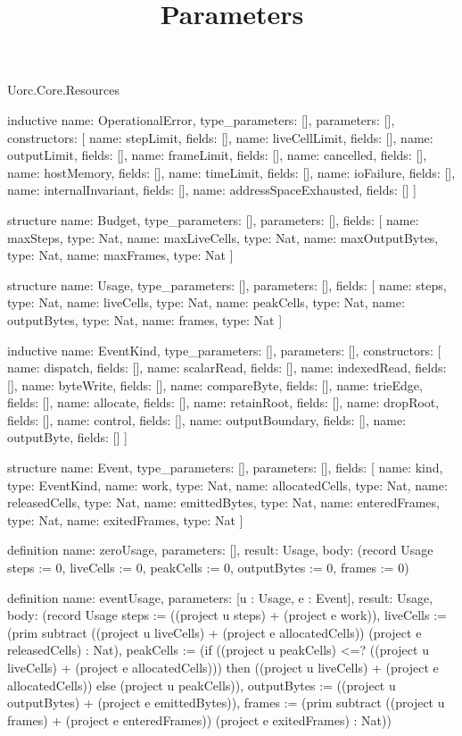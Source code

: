 \begin{lexlean}{Uorc.Core.Resources}
\title{Parameters}
\begin{semanticmodule}
inductive{
  name: OperationalError,
  type_parameters: [],
  parameters: [],
  constructors: [
    {name: stepLimit, fields: []},
    {name: liveCellLimit, fields: []},
    {name: outputLimit, fields: []},
    {name: frameLimit, fields: []},
    {name: cancelled, fields: []},
    {name: hostMemory, fields: []},
    {name: timeLimit, fields: []},
    {name: ioFailure, fields: []},
    {name: internalInvariant, fields: []},
    {name: addressSpaceExhausted, fields: []}
  ]
}

structure{
  name: Budget,
  type_parameters: [],
  parameters: [],
  fields: [
    {name: maxSteps, type: Nat},
    {name: maxLiveCells, type: Nat},
    {name: maxOutputBytes, type: Nat},
    {name: maxFrames, type: Nat}
  ]
}

structure{
  name: Usage,
  type_parameters: [],
  parameters: [],
  fields: [
    {name: steps, type: Nat},
    {name: liveCells, type: Nat},
    {name: peakCells, type: Nat},
    {name: outputBytes, type: Nat},
    {name: frames, type: Nat}
  ]
}

inductive{
  name: EventKind,
  type_parameters: [],
  parameters: [],
  constructors: [
    {name: dispatch, fields: []},
    {name: scalarRead, fields: []},
    {name: indexedRead, fields: []},
    {name: byteWrite, fields: []},
    {name: compareByte, fields: []},
    {name: trieEdge, fields: []},
    {name: allocate, fields: []},
    {name: retainRoot, fields: []},
    {name: dropRoot, fields: []},
    {name: control, fields: []},
    {name: outputBoundary, fields: []},
    {name: outputByte, fields: []}
  ]
}

structure{
  name: Event,
  type_parameters: [],
  parameters: [],
  fields: [
    {name: kind, type: EventKind},
    {name: work, type: Nat},
    {name: allocatedCells, type: Nat},
    {name: releasedCells, type: Nat},
    {name: emittedBytes, type: Nat},
    {name: enteredFrames, type: Nat},
    {name: exitedFrames, type: Nat}
  ]
}

definition{
  name: zeroUsage,
  parameters: [],
  result: Usage,
  body: (record Usage {steps := 0, liveCells := 0, peakCells := 0, outputBytes := 0, frames := 0})
}

definition{
  name: eventUsage,
  parameters: [u : Usage, e : Event],
  result: Usage,
  body: (record Usage {steps := ((project u steps) + (project e work)), liveCells := (prim subtract ((project u liveCells) + (project e allocatedCells)) (project e releasedCells) : Nat), peakCells := (if ((project u peakCells) <=? ((project u liveCells) + (project e allocatedCells))) then ((project u liveCells) + (project e allocatedCells)) else (project u peakCells)), outputBytes := ((project u outputBytes) + (project e emittedBytes)), frames := (prim subtract ((project u frames) + (project e enteredFrames)) (project e exitedFrames) : Nat)})
}


\end{semanticmodule}
\end{lexlean}
